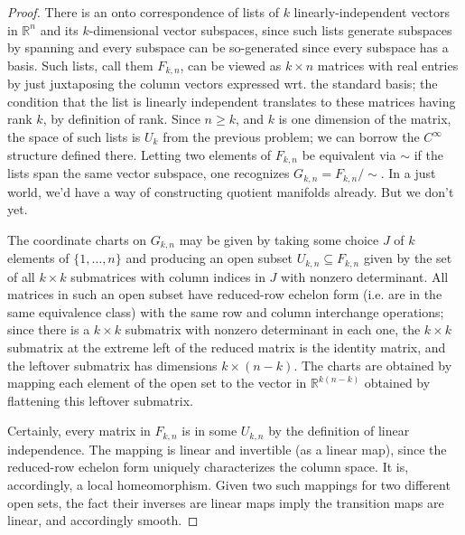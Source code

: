 \documentclass{article}
\begin{document}
\begin{proof}
  There is an onto correspondence of lists of $k$ linearly-independent vectors in $\mathbb{R}^{n}$ and its $k$-dimensional vector subspaces,
  since such lists generate subspaces by spanning and every subspace can be so-generated since every subspace has a basis.
  Such lists, call them $F_{k,n}$, can be viewed as $k \times n$ matrices with real entries by just juxtaposing the column vectors expressed
  wrt. the standard basis; the condition that the list is linearly independent translates to these matrices having rank $k$, by definition of rank.
  Since $n \geq k$, and $k$ is one dimension of the matrix, the space of such lists is $U_k$ from the previous problem;
  we can borrow the $C^{\infty}$ structure defined there.
  Letting two elements of $F_{k,n}$ be equivalent via $\sim$ if the lists span the same vector subspace, one recognizes $G_{k,n} = F_{k,n} / \sim$.
  In a just world, we'd have a way of constructing quotient manifolds already.
  But we don't yet.

  The coordinate charts on $G_{k, n}$ may be given by taking some choice $J$ of $k$ elements of $\{1, \ldots, n\}$
  and producing an open subset $U_{k, n} \subseteq F_{k,n}$ given by the set of all $k \times k$ submatrices with column indices in $J$
  with nonzero determinant.
  All matrices in such an open subset have reduced-row echelon form (i.e. are in the same equivalence class)
  with the same row and column interchange operations;
  since there is a $k \times k$ submatrix with nonzero determinant in each one, the $k \times k$ submatrix at the extreme left
  of the reduced matrix is the identity matrix, and the leftover submatrix has dimensions $k \times (n - k)$.
  The charts are obtained by mapping each element of the open set to the vector in $\mathbb{R}^{k(n - k)}$ obtained
  by flattening this leftover submatrix.

  Certainly, every matrix in $F_{k,n}$ is in some $U_{k,n}$ by the definition of linear independence.
  The mapping is linear and invertible (as a linear map), since the reduced-row echelon form uniquely characterizes the column space.
  It is, accordingly, a local homeomorphism.
  Given two such mappings for two different open sets, the fact their inverses are linear maps imply the transition maps are linear,
  and accordingly smooth.
\end{proof}
\end{document}

